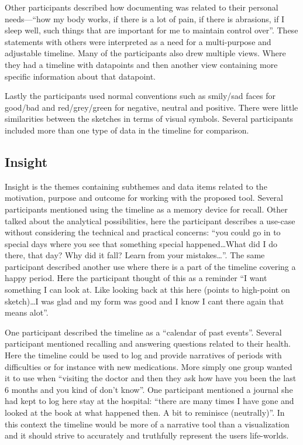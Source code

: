 \documentclass[11pt,UKenglish, a4paper]{article}
\begin{document}
Other participants described how documenting was related to their personal needs---``how my body works, if there is a lot of pain, if there is abrasions, if I sleep well, such things that are important for me to maintain control over''. These statements with others were interpreted as a need for a multi-purpose and adjustable timeline. Many of the participants also drew multiple views. Where they had a timeline with datapoints and then another view containing more specific information about that datapoint.

Lastly the participants used normal conventions such as smily/sad faces for good/bad and red/grey/green for negative, neutral and positive. There were little similarities between the sketches in terms of visual symbols. Several participants included more than one type of data in the timeline for comparison.  
\subsection{Insight}
Insight is the themes containing subthemes and data items related to the motivation, purpose and outcome for working with the proposed tool. Several participants mentioned using the timeline as a memory device for recall. Other talked about the analytical possibilities, here the participant describes a use-case without considering the technical and practical concerns: ``you could go in to special days where you see that something special happened\dots What did I do there, that day? Why did it fall? Learn from your mistakes\dots''. The same participant described another use where there is a part of the timeline covering a happy period. Here the participant thought of this as a reminder ``I want something I can look at. Like looking back at this here (points to high-point on sketch)\dots I was glad and my form was good and I know I cant there again that means alot''. 

One participant described the timeline as a ``calendar of past events''. Several participant mentioned recalling and answering questions related to their health. Here the timeline could be used to log and provide narratives of periods with difficulties or for instance with new medications. More simply one group wanted it to use when ``visiting the doctor and then they ask how have you been the last 6 months and you kind of don't know''. One participant mentioned a journal she had kept to log here stay at the hospital: ``there are many times I have gone and looked at the book at what happened then. A bit to reminisce (neutrally)''. In this context the timeline would be more of a narrative tool than a visualization and it should strive to accurately and truthfully represent the users life-worlds. 
\end{document}
